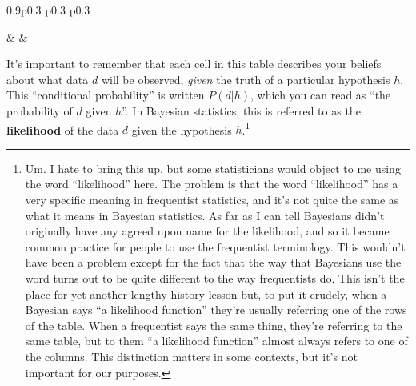 \documentclass[
  a4paper,
]{book}
\begin{document}
\begin{table}[ht]
\begin{centerbox}
\begin{threeparttable}
\begin{tabularx}{0.9\textwidth}{p{} p{} p{}}
\hhline{}

 &
 &
 \tabularnewline[-0.5pt]


\end{tabularx} 

\end{threeparttable}\par\end{centerbox}

\end{table}
 

It's important to remember that each cell in this table describes your
beliefs about what data \(d\) will be observed, \emph{given} the truth
of a particular hypothesis \(h\). This ``conditional probability'' is
written \(P(d|h)\), which you can read as ``the probability of \(d\)
given \(h\)''. In Bayesian statistics, this is referred to as the
\textbf{likelihood} of the data \(d\) given the hypothesis
\(h\).\footnote{Um. I hate to bring this up, but some statisticians
  would object to me using the word ``likelihood'' here. The problem is
  that the word ``likelihood'' has a very specific meaning in
  frequentist statistics, and it's not quite the same as what it means
  in Bayesian statistics. As far as I can tell Bayesians didn't
  originally have any agreed upon name for the likelihood, and so it
  became common practice for people to use the frequentist terminology.
  This wouldn't have been a problem except for the fact that the way
  that Bayesians use the word turns out to be quite different to the way
  frequentists do. This isn't the place for yet another lengthy history
  lesson but, to put it crudely, when a Bayesian says ``a likelihood
  function'' they're usually referring one of the rows of the table.
  When a frequentist says the same thing, they're referring to the same
  table, but to them ``a likelihood function'' almost always refers to
  one of the columns. This distinction matters in some contexts, but
  it's not important for our purposes.}
\end{document}
